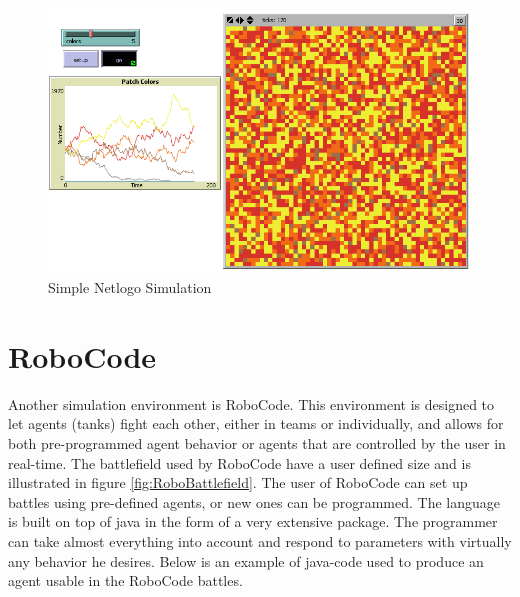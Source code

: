 \begin{figure}[H]
\begin{center}
\includegraphics[scale=0.6]{Images/NetLogo.png}%
\end{center}
\caption{Simple Netlogo Simulation}%
\label{fig:NetLogoscreen}%
\end{figure}

\section{RoboCode}

Another simulation environment is RoboCode. This environment is designed to let agents (tanks) fight each other, either in teams or individually, and allows for both pre-programmed agent behavior or agents that are controlled by the user in real-time. The battlefield used by RoboCode have a user defined size and is illustrated in figure \ref{fig:RoboBattlefield}. The user of RoboCode can set up battles using pre-defined agents, or new ones can be programmed. The language is built on top of java in the form of a very extensive package. The programmer can take almost everything into account and respond to parameters with virtually any behavior he desires. Below is an example of java-code used to produce an agent usable in the RoboCode battles.

\begin{java}{The First part of a RoboCode-Robot. Note the robocode package is imported}{}
package lrn;
import robocode.*;

public class MyFirstRobot extends Robot {
\end{java}

